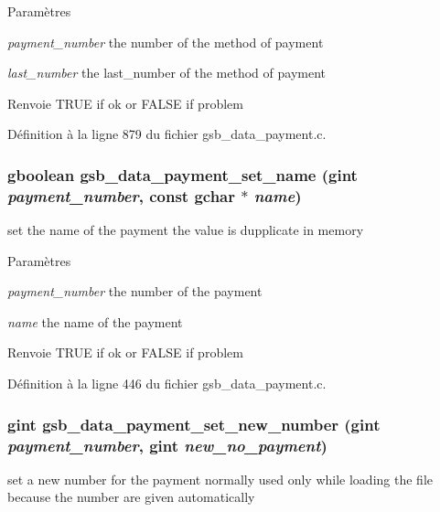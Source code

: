 \begin{DoxyParams}{Paramètres}
\item[{\em payment\_\-number}]the number of the method of payment \item[{\em last\_\-number}]the last\_\-number of the method of payment\end{DoxyParams}
\begin{DoxyReturn}{Renvoie}
TRUE if ok or FALSE if problem 
\end{DoxyReturn}


Définition à la ligne 879 du fichier gsb\_\-data\_\-payment.c.

\subsubsection[{gsb\_\-data\_\-payment\_\-set\_\-name}]{\setlength{\rightskip}{0pt plus 5cm}gboolean gsb\_\-data\_\-payment\_\-set\_\-name (gint {\em payment\_\-number}, \/  const gchar $\ast$ {\em name})}\label{gsb__data__payment_8c_a3e237dcdba177b752d7b340bdb9ea9a8}
set the name of the payment the value is dupplicate in memory


\begin{DoxyParams}{Paramètres}
\item[{\em payment\_\-number}]the number of the payment \item[{\em name}]the name of the payment\end{DoxyParams}
\begin{DoxyReturn}{Renvoie}
TRUE if ok or FALSE if problem 
\end{DoxyReturn}


Définition à la ligne 446 du fichier gsb\_\-data\_\-payment.c.

\subsubsection[{gsb\_\-data\_\-payment\_\-set\_\-new\_\-number}]{\setlength{\rightskip}{0pt plus 5cm}gint gsb\_\-data\_\-payment\_\-set\_\-new\_\-number (gint {\em payment\_\-number}, \/  gint {\em new\_\-no\_\-payment})}\label{gsb__data__payment_8c_a733c8bde55e9529a1b29a6b7125d6c5b}
set a new number for the payment normally used only while loading the file because the number are given automatically



